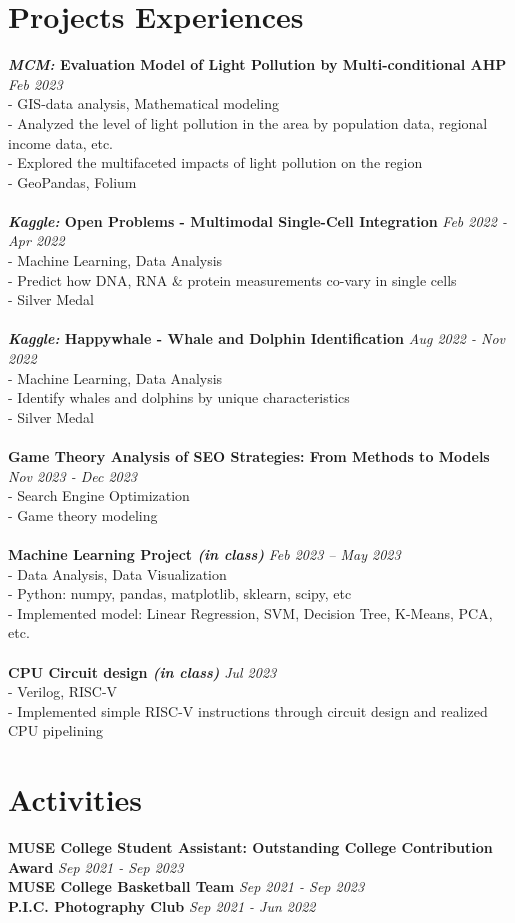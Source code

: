 \documentclass[a4paper,10pt]{article}
\begin{document}
\section*{Projects Experiences}
\textbf{\textit{MCM:} Evaluation Model of Light Pollution by Multi-conditional AHP} \hfill \textit{Feb 2023}\\
- GIS-data analysis, Mathematical modeling\\
- Analyzed the level of light pollution in the area by population data, regional income data, etc.\\
- Explored the multifaceted impacts of light pollution on the region\\
- GeoPandas, Folium\\
\\
\textbf{\textit{Kaggle:} Open Problems - Multimodal Single-Cell Integration} \hfill \textit{Feb 2022 - Apr 2022}\\
- Machine Learning, Data Analysis\\
- Predict how DNA, RNA \& protein measurements co-vary in single cells\\
- Silver Medal\\
\\
\textbf{\textit{Kaggle:} Happywhale - Whale and Dolphin Identification} \hfill \textit{Aug 2022 - Nov 2022}\\
- Machine Learning, Data Analysis\\
- Identify whales and dolphins by unique characteristics\\
- Silver Medal\\
\\
\textbf{Game Theory Analysis of SEO Strategies: From Methods to Models} \hfill \textit{Nov 2023 - Dec 2023}\\
- Search Engine Optimization\\
- Game theory modeling\\
\\
\textbf{Machine Learning Project \textit{(in class)}} \hfill \textit{Feb 2023 -- May 2023}\\
- Data Analysis, Data Visualization\\
- Python: numpy, pandas, matplotlib, sklearn, scipy, etc\\
- Implemented model: Linear Regression, SVM, Decision Tree, K-Means, PCA, etc.\\
\\
\textbf{CPU Circuit design \textit{(in class)}} \hfill \textit{Jul 2023}\\
- Verilog, RISC-V\\
- Implemented simple RISC-V instructions through circuit design and realized CPU pipelining

\section*{Activities}
\textbf{MUSE College Student Assistant: Outstanding College Contribution Award} \hfill \textit{Sep 2021 - Sep 2023}\\
\textbf{MUSE College Basketball Team} \hfill \textit{Sep 2021 - Sep 2023}\\
\textbf{P.I.C. Photography Club} \hfill \textit{Sep 2021 - Jun 2022}
\end{document}
